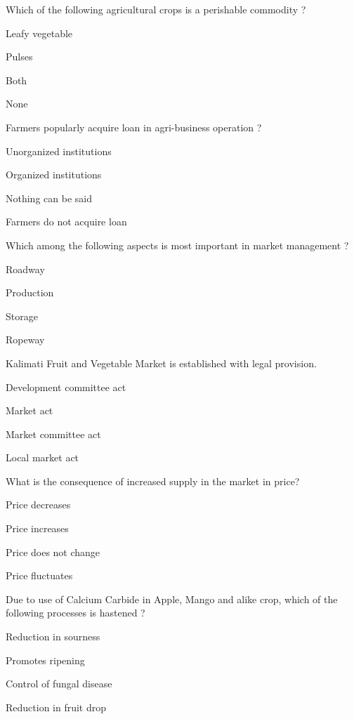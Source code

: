 \begin{questions}
\question Which of the following agricultural crops is a perishable commodity ?
\begin{items}
\item* Leafy vegetable
\item Pulses
\item Both
\item None
\end{items}

\question Farmers popularly acquire \fillin[][3cm] loan in agri-business operation ?
\begin{items}
\item* Unorganized institutions
\item Organized institutions
\item Nothing can be said
\item Farmers do not acquire loan
\end{items}

\question Which among the following aspects is most important in market management ?
\begin{items}
\item* Roadway
\item Production
\item Storage
\item Ropeway
\end{items}

\question Kalimati Fruit and Vegetable Market is established with \fillin[][3cm] legal provision.
\begin{items}
\item* Development committee act
\item Market act
\item Market committee act
\item Local market act
\end{items}

\question What is the consequence of increased supply in the market in price?
\begin{items}
\item* Price decreases
\item Price increases
\item Price does not change
\item Price fluctuates
\end{items}

\question Due to use of Calcium Carbide in Apple, Mango and alike crop, which of the following processes is hastened ?
\begin{items}
\item Reduction in sourness
\item* Promotes ripening
\item Control of fungal disease
\item Reduction in fruit drop
\end{items}


\end{questions}
